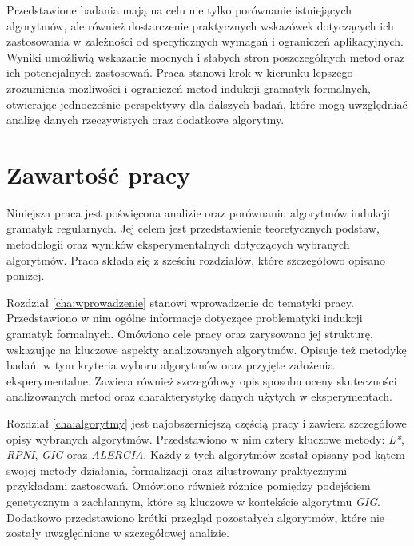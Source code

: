 Przedstawione badania mają na celu nie tylko porównanie istniejących algorytmów, ale również dostarczenie praktycznych wskazówek dotyczących ich zastosowania w zależności od specyficznych wymagań i ograniczeń aplikacyjnych. Wyniki umożliwią wskazanie mocnych i słabych stron poszczególnych metod oraz ich potencjalnych zastosowań. Praca stanowi krok w kierunku lepszego zrozumienia możliwości i ograniczeń metod indukcji gramatyk formalnych, otwierając jednocześnie perspektywy dla dalszych badań, które mogą uwzględniać analizę danych rzeczywistych oraz dodatkowe algorytmy.  


\section{Zawartość pracy}
\label{sec:zawartoscPracy}


Niniejsza praca jest poświęcona analizie oraz porównaniu algorytmów indukcji gramatyk regularnych. Jej celem jest przedstawienie teoretycznych podstaw, metodologii oraz wyników eksperymentalnych dotyczących wybranych algorytmów. Praca składa się z sześciu rozdziałów, które szczegółowo opisano poniżej.

Rozdział \ref{cha:wprowadzenie} stanowi wprowadzenie do tematyki pracy. Przedstawiono w nim ogólne informacje dotyczące problematyki indukcji gramatyk formalnych. Omówiono cele pracy oraz zarysowano jej strukturę, wskazując na kluczowe aspekty analizowanych algorytmów. Opisuje też metodykę badań, w tym kryteria wyboru algorytmów oraz przyjęte założenia eksperymentalne. Zawiera również szczegółowy opis sposobu oceny skuteczności analizowanych metod oraz charakterystykę danych użytych w eksperymentach. 

Rozdział \ref{cha:algorytmy} jest najobszerniejszą częścią pracy i zawiera szczegółowe opisy wybranych algorytmów. Przedstawiono w nim cztery kluczowe metody: \textit{L*}, \textit{RPNI}, \textit{GIG} oraz \textit{ALERGIA}. Każdy z tych algorytmów został opisany pod kątem swojej metody działania, formalizacji oraz zilustrowany praktycznymi przykładami zastosowań. Omówiono również różnice pomiędzy podejściem genetycznym a zachłannym, które są kluczowe w kontekście algorytmu \textit{GIG}. Dodatkowo przedstawiono krótki przegląd pozostałych algorytmów, które nie zostały uwzględnione w szczegółowej analizie.

